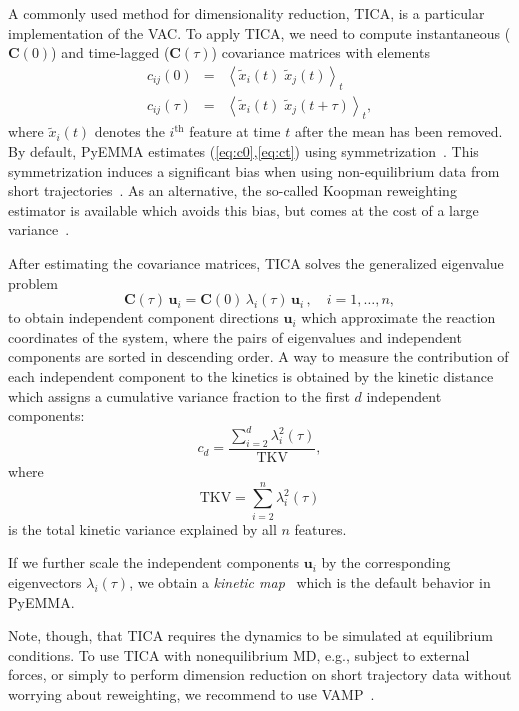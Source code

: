 \documentclass[9pt,tutorial]{livecoms}
\begin{document}
A commonly used method for dimensionality reduction, TICA, is a particular implementation of the VAC.
To apply TICA, we need to compute instantaneous ($\mathbf{C}(0)$) and time-lagged ($\mathbf{C}(\tau)$) covariance matrices with elements
\begin{eqnarray}
c_{ij}(0) & = & \left\langle \tilde{x}_i(t) \; \tilde{x}_j(t) \right\rangle_t \label{eq:c0}\\
c_{ij}(\tau) & = & \left\langle \tilde{x}_i(t) \; \tilde{x}_j(t + \tau) \right\rangle_t, \label{eq:ct}
\end{eqnarray}
where $\tilde{x}_i(t)$ denotes the $i^\textrm{th}$ feature at time $t$ after the mean has been removed.
By default, PyEMMA estimates (\ref{eq:c0},\ref{eq:ct}) using symmetrization~\cite{tica}.
This symmetrization induces a significant bias when using non-equilibrium data from short trajectories~\cite{hao-variational-koopman-models}.
As an alternative, the so-called Koopman reweighting estimator is available which avoids this bias,
but comes at the cost of a large variance~\cite{hao-variational-koopman-models}.

After estimating the covariance matrices, TICA solves the generalized eigenvalue problem
\begin{equation}
\mathbf{C}(\tau) \, \mathbf{u}_i = \mathbf{C}(0) \, \lambda_i(\tau) \, \mathbf{u}_i \,, \quad i=1,\dots,n,
\end{equation}
to obtain independent component directions $\mathbf{u}_i$ which approximate the reaction coordinates of the system,
where the pairs of eigenvalues and independent components are sorted in descending order.
A way to measure the contribution of each independent component to the kinetics
is obtained by the kinetic distance~\cite{kinetic-maps}
which assigns a cumulative variance fraction to the first $d$ independent components:
\begin{equation}
c_d = \frac{\sum_{i=2}^d \lambda_i^2(\tau)}{\textrm{TKV}},
\end{equation}
where
\begin{equation}
\textrm{TKV} = \sum\limits_{i=2}^n \lambda_i^2(\tau)
\end{equation}
is the total kinetic variance explained by all $n$ features.

If we further scale the independent components $\mathbf{u}_i$ by the corresponding eigenvectors $\lambda_i(\tau)$,
we obtain a \emph{kinetic map}~\cite{kinetic-maps} which is the default behavior in PyEMMA.

Note, though, that TICA requires the dynamics to be simulated at equilibrium conditions.
To use TICA with nonequilibrium MD, e.g., subject to external forces,
or simply to perform dimension reduction on short trajectory data without worrying about reweighting,
we recommend to use VAMP~\cite{vamp-preprint}.
\end{document}
